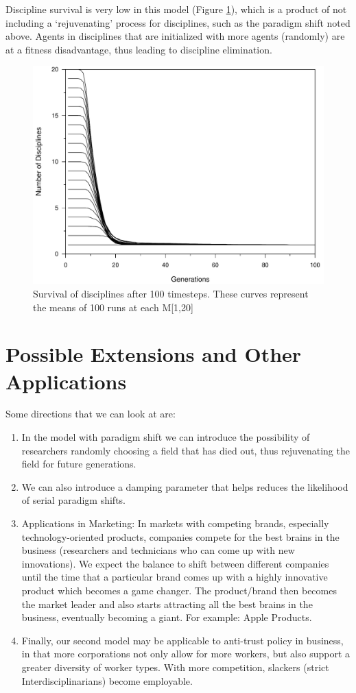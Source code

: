 \documentclass[letterpaper]{article} %
\begin{document}
Discipline survival is very low in this model (Figure \ref{fig:4}), which is a product of not including a `rejuvenating' process for disciplines, such as the paradigm shift noted above. Agents in disciplines that are initialized with more agents (randomly) are at a fitness disadvantage, thus leading to discipline elimination.

\begin{figure}[H]
\centering
\small
\includegraphics{Grinders-005}
\caption{Survival of disciplines after 100 timesteps. These curves represent the means of 100 runs at each M[1,20]}
\label{fig:4}
\end{figure}

\section{Possible Extensions and Other Applications}
Some directions that we can look at are:
\begin{enumerate}
\item
In the model with paradigm shift we can introduce the possibility of researchers randomly choosing a field that has died out, thus rejuvenating the field for future generations.
\item
We can also introduce a damping parameter that helps reduces the likelihood of serial paradigm shifts.
\item
Applications in Marketing: In markets with competing brands, especially technology-oriented products, companies compete for the best brains in the business (researchers and technicians who can come up with new innovations). We expect the balance to shift between different companies until the time that a particular brand comes up with a highly innovative product which becomes a game changer. The product/brand then becomes the market leader and also starts attracting all the best brains in the business, eventually becoming a giant. For example: Apple Products.
\item
Finally, our second model may be applicable to anti-trust policy in business, in that more corporations not only allow for more workers, but also support a greater diversity of worker types. With more competition, slackers (strict Interdisciplinarians) become employable.
\end{enumerate}
\end{document}
